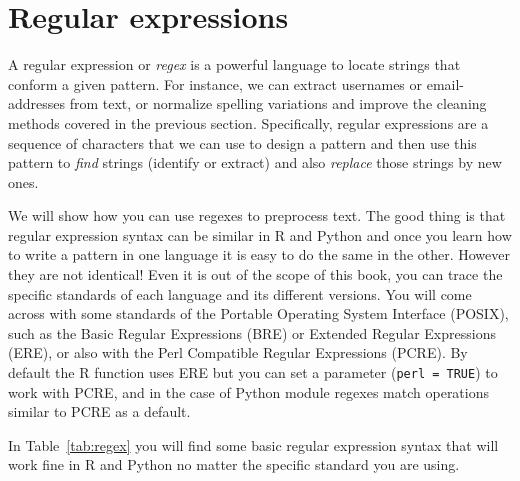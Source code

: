 \section{Regular expressions}
\label{sec:regular}

A regular expression or \emph{regex} is a powerful language to locate strings that conform a given pattern. For instance, we can extract usernames or email-addresses from text, or normalize spelling variations and improve the cleaning methods covered in the previous section. Specifically, regular expressions are a sequence of characters that we can use to design a pattern and then use this pattern to \emph{find} strings (identify or extract) and also \emph{replace} those strings by new ones. 

We will show how you can use regexes to preprocess text. The good thing is that regular expression syntax can be similar in R and Python and once you learn how to write a pattern in one language it is easy to do the same in the other.  However they are not identical! Even it is out of the scope of this book, you can trace the specific standards of each language and its different versions. You will come across with some standards of the Portable Operating System Interface (POSIX), such as the Basic Regular Expressions (BRE) or Extended Regular Expressions (ERE), or also with the Perl Compatible Regular Expressions (PCRE).  By default the R function  uses ERE but you can set a parameter (\verb|perl = TRUE|) to work with PCRE, and in the case of Python  module regexes match operations similar to PCRE as a default.

In Table~\ref{tab:regex} you will find some basic regular expression syntax that will work fine in R and Python no matter the specific standard you are using.


\newcommand{\bs}[1]{\texttt{\textbackslash#1}}


